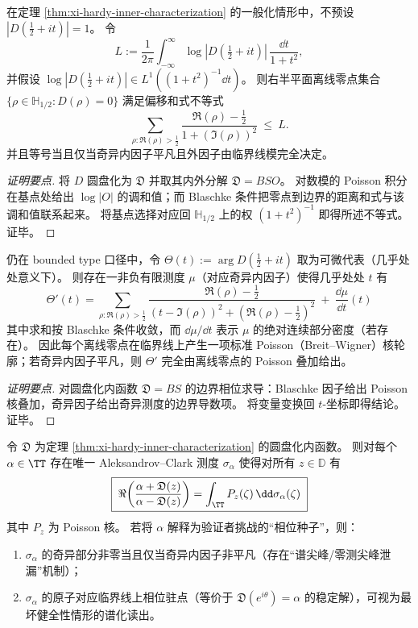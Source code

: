 \begin{proposition}\label{prop:xi-leakage-zero-offset-sum}
在定理 \ref{thm:xi-hardy-inner-characterization} 的一般化情形中，不预设 \(|D(\tfrac12+it)|=1\)。
令
\[
L:=\frac{1}{2\pi}\int_{-\infty}^{\infty}\log |D(\tfrac12+it)|\,\frac{\dd t}{1+t^2},
\]
并假设 \(\log|D(\tfrac12+it)|\in L^1((1+t^2)^{-1}\dd t)\)。
则右半平面离线零点集合 \(\{\rho\in\mathbb{H}_{1/2}:D(\rho)=0\}\) 满足偏移和式不等式
\[
\boxed{\;
\sum_{\rho:\Re(\rho)>\frac12}\frac{\Re(\rho)-\frac12}{1+(\Im(\rho))^2}\ \le\ L.\;}
\]
并且等号当且仅当奇异内因子平凡且外因子由临界线模完全决定。
\end{proposition}
\begin{proof}[证明要点]
将 \(D\) 圆盘化为 \(\mathfrak{D}\) 并取其内外分解 \(\mathfrak{D}=BSO\)。
对数模的 Poisson 积分在基点处给出 \(\log|O|\) 的调和值；而 Blaschke 条件把零点到边界的距离和式与该调和值联系起来。
将基点选择对应回 \(\mathbb{H}_{1/2}\) 上的权 \((1+t^2)^{-1}\) 即得所述不等式。证毕。
\end{proof}

\begin{proposition}\label{prop:xi-phase-derivative-poisson-superposition}
仍在 bounded type 口径中，令 \(\Theta(t):=\arg D(\tfrac12+it)\) 取为可微代表（几乎处处意义下）。
则存在一非负有限测度 \(\mu\)（对应奇异内因子）使得几乎处处 \(t\) 有
\[
\boxed{\;
\Theta'(t)=
\sum_{\rho:\Re(\rho)>\frac12}
\frac{\Re(\rho)-\frac12}{(t-\Im(\rho))^2+(\Re(\rho)-\frac12)^2}
\ +\ \frac{\dd\mu}{\dd t}(t)\;}
\]
其中求和按 Blaschke 条件收敛，而 \(\dd\mu/\dd t\) 表示 \(\mu\) 的绝对连续部分密度（若存在）。
因此每个离线零点在临界线上产生一项标准 Poisson（Breit--Wigner）核轮廓；若奇异内因子平凡，则 \(\Theta'\) 完全由离线零点的 Poisson 叠加给出。
\end{proposition}
\begin{proof}[证明要点]
对圆盘化内函数 \(\mathfrak{D}=BS\) 的边界相位求导：Blaschke 因子给出 Poisson 核叠加，奇异因子给出奇异测度的边界导数项。
将变量变换回 \(t\)-坐标即得结论。证毕。
\end{proof}

\begin{corollary}\label{cor:xi-clark-measure-horizon-semantics}
令 \(\mathfrak{D}\) 为定理 \ref{thm:xi-hardy-inner-characterization} 的圆盘化内函数。
则对每个 \(\alpha\in\TT\) 存在唯一 Aleksandrov--Clark 测度 \(\sigma_\alpha\) 使得对所有 \(z\in\mathbb{D}\) 有
\[
\boxed{\;
\Re\!\left(\frac{\alpha+\mathfrak{D}(z)}{\alpha-\mathfrak{D}(z)}\right)
=\int_{\TT} P_z(\zeta)\,\dd\sigma_\alpha(\zeta)\;}
\]
其中 \(P_z\) 为 Poisson 核。
若将 \(\alpha\) 解释为验证者挑战的“相位种子”，则：
\begin{enumerate}
  \item \(\sigma_\alpha\) 的奇异部分非零当且仅当奇异内因子非平凡（存在“谱尖峰/零测尖峰泄漏”机制）；
  \item \(\sigma_\alpha\) 的原子对应临界线上相位驻点（等价于 \(\mathfrak{D}(e^{i\theta})=\alpha\) 的稳定解），可视为最坏健全性情形的谱化读出。
\end{enumerate}
\end{corollary}

